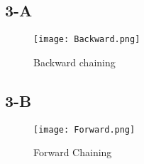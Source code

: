 \documentclass{article}
\begin{document}
        \subsection{3-A}
            \begin{figure}[H]
                \centering
                \texttt{[image: Backward.png]}
                \caption{Backward chaining}
            \end{figure}
        \subsection{3-B}
            \begin{figure}[H]
                \centering
                \texttt{[image: Forward.png]}
                \caption{Forward Chaining}
            \end{figure}
\end{document}
